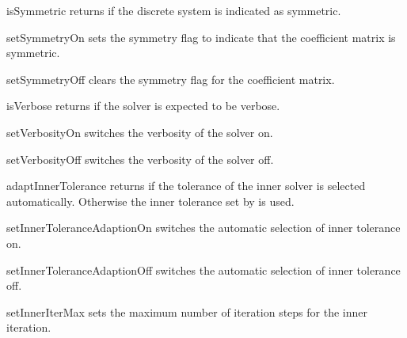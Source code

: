 \begin{methoddesc}[SolverOptions]{isSymmetric}{}
returns \True if the discrete system is indicated as symmetric.
\end{methoddesc}

\begin{methoddesc}[SolverOptions]{setSymmetryOn}{}
sets the symmetry flag to indicate that the coefficient matrix is symmetric.
\end{methoddesc}

\begin{methoddesc}[SolverOptions]{setSymmetryOff}{}
clears the symmetry flag for the coefficient matrix.
\end{methoddesc}

\begin{methoddesc}[SolverOptions]{isVerbose}{}
returns \True if the solver is expected to be verbose.
\end{methoddesc}

\begin{methoddesc}[SolverOptions]{setVerbosityOn}{}
switches the verbosity of the solver on.
\end{methoddesc}

\begin{methoddesc}[SolverOptions]{setVerbosityOff}{}
switches the verbosity of the solver off.
\end{methoddesc}

\begin{methoddesc}[SolverOptions]{adaptInnerTolerance}{}
returns \True if the tolerance of the inner solver is selected automatically.
Otherwise the inner tolerance set by  is used.
\end{methoddesc}

\begin{methoddesc}[SolverOptions]{setInnerToleranceAdaptionOn}{}
switches the automatic selection of inner tolerance on.
\end{methoddesc}

\begin{methoddesc}[SolverOptions]{setInnerToleranceAdaptionOff}{}
switches the automatic selection of inner tolerance off.
\end{methoddesc}

\begin{methoddesc}[SolverOptions]{setInnerIterMax}{}
sets the maximum number of iteration steps for the inner iteration.
\end{methoddesc}

